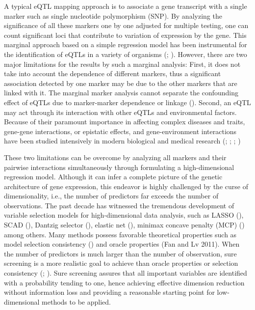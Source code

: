 \documentclass[11pt,]{book}
\theoremstyle{definition}
\theoremstyle{definition}
\theoremstyle{remark}
\begin{document}
A typical eQTL mapping approach is to associate a gene transcript with a
single marker such as single nucleotide polymorphism (SNP). By analyzing
the significance of all these markers one by one adjusted for multiple
testing, one can count significant loci that contribute to variation of
expression by the gene. This marginal approach based on a simple
regression model has been instrumental for the identification of eQTLs
in a variety of organisms (\cite{rockman2010selection};
\cite{kim2014meta}). However, there are two major limitations for the
results by such a marginal analysis: First, it does not take into
account the dependence of different markers, thus a significant
association detected by one marker may be due to the other markers that
are linked with it. The marginal marker analysis cannot separate the
confounding effect of eQTLs due to marker-marker dependence or linkage
(\cite{wu2007statistical}). Second, an eQTL may act through its
interaction with other eQTLs and environmental factors. Because of their
paramount importance in affecting complex diseases and traits, gene-gene
interactions, or epistatic effects, and gene-environment interactions
have been studied intensively in modern biological and medical research
(\cite{cheverud1995epistasis}; \cite{moore2003ubiquitous};
\cite{van2010detection}; \cite{mackay2014epistasis})

These two limitations can be overcome by analyzing all markers and their
pairwise interactions simultaneously through formulating a
high-dimensional regression model. Although it can infer a complete
picture of the genetic architecture of gene expression, this endeavor is
highly challenged by the curse of dimensionality, i.e., the number of
predictors far exceeds the number of observations. The past decade has
witnessed the tremendous development of variable selection models for
high-dimensional data analysis, such as LASSO
(\cite{tibshirani1996regression}), SCAD (\cite{fan2001variable}),
Dantzig selector (\cite{candes2007dantzig}), elastic net
(\cite{zhao2006model}), minimax concave penalty (MCP)
(\cite{zhang2010nearly}) among others. Many methods possess favorable
theoretical properties such as model selection consistency
(\cite{zhao2006model}) and oracle properties (Fan and Lv 2011). When the
number of predictors is much larger than the number of observation, sure
screening is a more realistic goal to achieve than oracle properties or
selection consistency (\cite{fan2008sure}; \cite{wang2009forward}). Sure
screening assures that all important variables are identified with a
probability tending to one, hence achieving effective dimension
reduction without information loss and providing a reasonable starting
point for low-dimensional methods to be applied.
\end{document}
